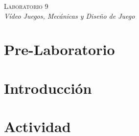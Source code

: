 \begin{center}
\textsc{\Large Laboratorio 9}~\\
\emph{\large Vídeo Juegos, Mecánicas y Diseño de Juego}
\end{center}

\section{Pre-Laboratorio}

\section{Introducción}

\section{Actividad}
